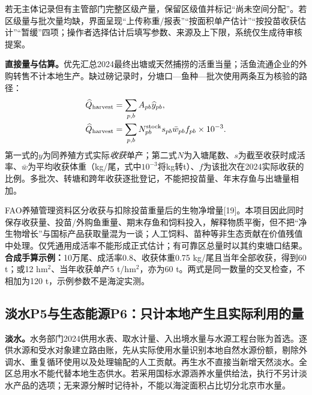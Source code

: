\documentclass[12pt,a4paper,fontset=fandol]{ctexart}
\begin{document}
若无主体记录但有主管部门完整区级产量，保留区级值并标记“尚未空间分配”。若区级量与批次量均缺，界面呈现“上传称重/报表”“按面积单产估计”“按投苗收获估计”“暂缓”四项；操作者选择估计后填写参数、来源及上下限，系统仅生成待审核提案。

\textbf{直接量与估算。}优先汇总2024最终出塘或天然捕捞的活重当量；活鱼流通企业的外购转售不计本地生产。缺过磅记录时，分塘口—鱼种—批次使用两条互为核验的路径：
\begin{align}
 \widehat Q_{\rm harvest}&=\sum_{p,b}A_{pb}\widehat y_{pb},\\
 \widehat Q_{\rm harvest}&=\sum_{p,b}N_{pb}^{\rm stock}s_{pb}\bar w_{pb}f_{pb}\times10^{-3}.
\end{align}
第一式的$y$为同养殖方式实际\emph{收获}单产；第二式$N$为入塘尾数、$s$为截至收获时成活率、$\bar w$为平均收获体重（kg/尾，式中$10^{-3}$将kg转t）、$f$为该批次在2024实际收获的比例。多批次、转塘和跨年收获逐批登记，不能把投苗量、年末存鱼与出塘量相加。

FAO养殖管理资料区分收获与扣除投苗重量后的生物净增量[19]。本项目因此同时保存收获量、投苗/外购鱼重量、期末存鱼和饲料投入，解释物质平衡，但不把“净生物增长”与国标产品获取量混为一谈；人工饲料、苗种等非生态贡献在价值残值中处理。仅凭通用成活率不能形成正式估计；有可靠区总量时以其约束塘口结果。\textbf{合成手算示例：}10万尾、成活率0.8、收获体重0.75 kg/尾且当年全部收获，得到60 t；或12 hm$^2$、当年收获单产5 t/hm$^2$，亦为60 t。两式是同一数量的交叉检查，不相加为120 t，示例参数不是海淀实测。

\subsection{淡水P5与生态能源P6：只计本地产生且实际利用的量}
\textbf{淡水。}水务部门2024供用水表、取水计量、入出境水量与水源工程台账为首选。逐供水源和受水对象建立路由账，先从实际使用水量识别本地自然水源份额，剔除外调水、重复循环使用以及处理输配的人工贡献。再生水不直接当新增天然淡水。全区总用水不能代替本地生态供水。若采用国标水源涵养水量供给法，执行不另计淡水产品的选项；无来源分解时记待补，不能以海淀面积占比切分北京市水量。
\end{document}

